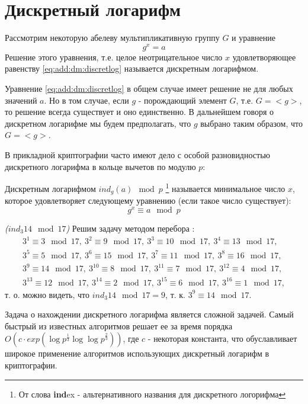 \section{Дискретный логарифм}
\label{AddDiscretLog}

\begin{definition}
Рассмотрим некоторую абелеву мультипликативную группу $G$ и уравнение 
\begin{equation}
g^x = a
\label{eq:add:dm:discretlog}
\end{equation}
Решение этого уравнения, т.е. целое неотрицательное число $x$
удовлетворяющее равенству \eqref{eq:add:dm:discretlog} называется
дискретным логарифмом.
\end{definition}

Уравнение \eqref{eq:add:dm:discretlog} в общем случае имеет решение не
для любых значений $a$. Но в том случае, если $g$ - порождающий
элемент $G$, т.е. $G=<g>$, то решение всегда существует и оно
единственно. В дальнейшем говоря о дискретном логарифме мы будем
предполагать, что $g$ выбрано таким образом, что $G=<g>$.

В прикладной криптографии часто имеют дело с особой разновидностью
дискретного логарифма в кольце вычетов по модулю $p$:
\begin{definition}
Дискретным логарифмом $ind_g\left(a\right) \mod{p}$
\footnote{От слова {\bf ind}ex - альтернативного названия для дискретного логорифма}
называется
минимальное число $x$, которое удовлетворяет следующему уравнению
(если такое число существует): 
\begin{equation}
g^x \equiv a \mod{p}
\end{equation}
\end{definition}

\begin{example}
\emph{($ind_3{14} \mod{17}$)}
Решим задачу методом перебора \cite{bWikiDiscretLog}:
\begin{eqnarray}
3^1 \equiv 3 \mod{17},\: 
3^2 \equiv 9 \mod{17},\: 
3^3 \equiv 10 \mod{17},\:
3^4 \equiv 13 \mod{17}, 
\nonumber \\
3^5 \equiv 5 \mod{17},\: 
3^6 \equiv 15 \mod{17},\: 
3^7 \equiv 11 \mod{17},\: 
3^8 \equiv 16 \mod{17}, 
\nonumber \\
3^9 \equiv 14 \mod{17},\: 
3^{10} \equiv 8 \mod{17},\: 
3^{11} \equiv 7 \mod{17},\: 
3^{12} \equiv 4 \mod{17}, 
\nonumber \\
3^{13} \equiv 12 \mod{17},\: 
3^{14} \equiv 2 \mod{17},\:
3^{15} \equiv 6 \mod{17},\: 
3^{16} \equiv 1 \mod{17},
\nonumber
\end{eqnarray}
т. о. можно видеть, что $ind_3{14} \mod{17} = 9$, 
т. к. $3^9 \equiv 14 \mod{17}$. 
\label{ex:dm:discretlog}
\end{example}

Задача о нахождении дискретного логарифма является сложной
задачей. Самый быстрый из известных алгоритмов
\cite{bGordon93discretelogarithms} решает ее за время порядка 
\(
O\left(c \cdot
exp\left(\log{p}^{\frac{1}{3}}\log{\log{p}}^{\frac{2}{3}}
\right)\right)
\), где $c$ - некоторая константа,
что обуславливает широкое применение алгоритмов использующих
дискретный логарифм в криптографии.
